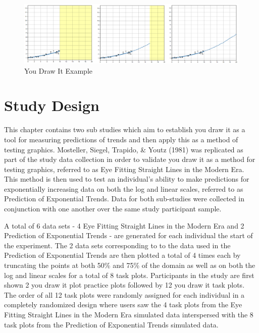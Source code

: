 \documentclass[print]{nuthesis}
\begin{document}
\begin{figure}[tbp]

{\centering \includegraphics[width=1.1\linewidth,]{images/ydiExample-0.10-10-linear} 

}

\caption{You Draw It Example}\label{fig:youdrawit-example}
\end{figure}

\hypertarget{study-design-1}{%
\section{Study Design}\label{study-design-1}}

This chapter contains two sub studies which aim to establish you draw it as a tool for measuring predictions of trends and then apply this as a method of testing graphics.
Mosteller, Siegel, Trapido, \& Youtz (1981) was replicated as part of the study data collection in order to validate you draw it as a method for testing graphics, referred to as Eye Fitting Straight Lines in the Modern Era.
This method is then used to test an individual's ability to make predictions for exponentially increasing data on both the log and linear scales, referred to as Prediction of Exponential Trends.
Data for both sub-studies were collected in conjunction with one another over the same study participant sample.

A total of 6 data sets - 4 Eye Fitting Straight Lines in the Modern Era and 2 Prediction of Exponential Trends - are generated for each individual the start of the experiment.
The 2 data sets corresponding to to the data used in the Prediction of Exponential Trends are then plotted a total of 4 times each by truncating the points at both 50\% and 75\% of the domain as well as on both the log and linear scales for a total of 8 task plots.
Participants in the study are first shown 2 you draw it plot practice plots followed by 12 you draw it task plots.
The order of all 12 task plots were randomly assigned for each individual in a completely randomized design where users saw the 4 task plots from the Eye Fitting Straight Lines in the Modern Era simulated data interspersed with the 8 task plots from the Prediction of Exponential Trends simulated data.
\end{document}

